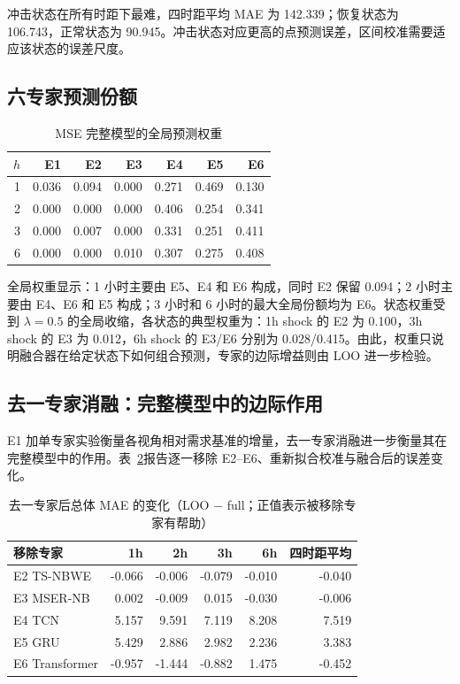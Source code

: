 \documentclass[UTF8,11pt,a4paper]{ctexart}
\begin{document}
冲击状态在所有时距下最难，四时距平均 MAE 为 142.339；恢复状态为 106.743，正常状态为 90.945。冲击状态对应更高的点预测误差，区间校准需要适应该状态的误差尺度。

\subsection{六专家预测份额}

\begin{table}[H]
\centering
\caption{MSE 完整模型的全局预测权重}
\label{tab:global-weights}
\begin{tabular}{rrrrrrr}
\toprule
$h$ & E1 & E2 & E3 & E4 & E5 & E6\\
\midrule
1 & 0.036 & 0.094 & 0.000 & 0.271 & 0.469 & 0.130\\
2 & 0.000 & 0.000 & 0.000 & 0.406 & 0.254 & 0.341\\
3 & 0.000 & 0.007 & 0.000 & 0.331 & 0.251 & 0.411\\
6 & 0.000 & 0.000 & 0.010 & 0.307 & 0.275 & 0.408\\
\bottomrule
\end{tabular}
\end{table}

全局权重显示：1 小时主要由 E5、E4 和 E6 构成，同时 E2 保留 0.094；2 小时主要由 E4、E6 和 E5 构成；3 小时和 6 小时的最大全局份额均为 E6。状态权重受到 $\lambda=0.5$ 的全局收缩，各状态的典型权重为：1h shock 的 E2 为 0.100，3h shock 的 E3 为 0.012，6h shock 的 E3/E6 分别为 0.028/0.415。由此，权重只说明融合器在给定状态下如何组合预测，专家的边际增益则由 LOO 进一步检验。

\subsection{去一专家消融：完整模型中的边际作用}
\label{sec:loo}

E1 加单专家实验衡量各视角相对需求基准的增量，去一专家消融进一步衡量其在完整模型中的作用。表~\ref{tab:loo}报告逐一移除 E2--E6、重新拟合校准与融合后的误差变化。

\begin{table}[H]
\centering
\caption{去一专家后总体 MAE 的变化（LOO $-$ full；正值表示被移除专家有帮助）}
\label{tab:loo}
\small
\begin{tabular}{lrrrrr}
\toprule
移除专家 & 1h & 2h & 3h & 6h & 四时距平均\\
\midrule
E2 TS-NBWE & -0.066 & -0.006 & -0.079 & -0.010 & -0.040\\
E3 MSER-NB &  0.002 & -0.009 &  0.015 & -0.030 & -0.006\\
E4 TCN & 5.157 & 9.591 & 7.119 & 8.208 & 7.519\\
E5 GRU & 5.429 & 2.886 & 2.982 & 2.236 & 3.383\\
E6 Transformer & -0.957 & -1.444 & -0.882 & 1.475 & -0.452\\
\bottomrule
\end{tabular}
\end{table}
\end{document}
